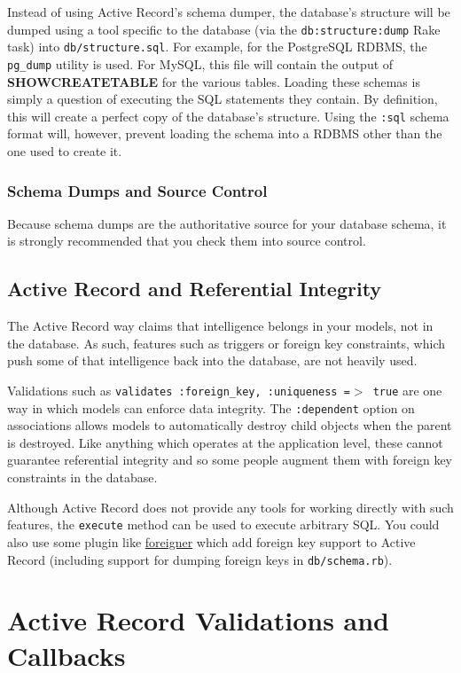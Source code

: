 \documentclass[10pt]{book}
\begin{document}
Instead of using Active Record’s schema dumper, the database’s structure will be dumped using a tool specific to the database (via the \texttt{db:structure:dump} Rake task) into \texttt{db/structure.sql}. For example, for the PostgreSQL RDBMS, the \texttt{pg\_dump} utility is used. For MySQL, this file will contain the output of \textbf{SHOWCREATETABLE} for the various tables. Loading these schemas is simply a question of executing the SQL statements they contain. By definition, this will create a perfect copy of the database’s structure. Using the \texttt{:sql} schema format will, however, prevent loading the schema into a RDBMS other than the one used to create it.

\subsection{ Schema Dumps and Source Control}

Because schema dumps are the authoritative source for your database schema, it is strongly recommended that you check them into source control.

\section{ Active Record and Referential Integrity}

The Active Record way claims that intelligence belongs in your models, not in the database. As such, features such as triggers or foreign key constraints, which push some of that intelligence back into the database, are not heavily used.

Validations such as \texttt{validates :foreign\_key, :uniqueness =$>$ true} are one way in which models can enforce data integrity. The \texttt{:dependent} option on associations allows models to automatically destroy child objects when the parent is destroyed. Like anything which operates at the application level, these cannot guarantee referential integrity and so some people augment them with foreign key constraints in the database.

Although Active Record does not provide any tools for working directly with such features, the \texttt{execute} method can be used to execute arbitrary SQL. You could also use some plugin like \href{https://github.com/matthuhiggins/foreigner}{foreigner} which add foreign key support to Active Record (including support for dumping foreign keys in \texttt{db/schema.rb}).

\chapter{Active Record Validations and Callbacks}
\end{document}
